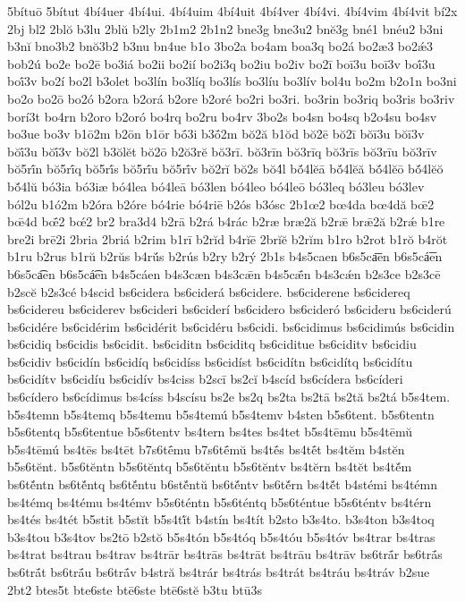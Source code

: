 {5bítuō
5bítut
4bí4uer
4bí4ui.
4bí4uim
4bí4uit
4bí4ver
4bí4vi.
4bí4vim
4bí4vit
bí2x
2bj
bl2
2blŏ
b3lu
2blŭ
b2ly
2b1m2
2b1n2
bne3g
bne3u2
bnĕ3g
bné1
bnéu2
b3ni
b3nĭ
bno3b2
bnŏ3b2
b3nu
bn4ue
b1o
3bo2a
bo4am
boa3q
bo2á
bo2æ3
bo2ǽ3
bob2ú
bo2e
bo2ē
bo3iá
bo2ii
bo2ií
bo2i3q
bo2iu
bo2iv
bo2ī
boī3u
boī3v
boī́3u
boī́3v
bo2í
bo2l
b3olet
bo3lín
bo3líq
bo3lís
bo3líu
bo3lív
bol4u
bo2m
b2o1n
bo3ni
bo2o
bo2ō
bo2ó
b2ora
b2orá
b2ore
b2oré
bo2ri
bo3ri.
bo3rin
bo3riq
bo3ris
bo3riv
borí3t
bo4rn
b2oro
b2oró
bo4rq
bo2ru
bo4rv
3bo2s
bo4sn
bo4sq
b2o4su
bo4sv
bo3ue
bo3v
b1ō2m
b2ōn
b1ōr
bṓ3i
b3ṓ2m
bŏ2ă
b1ŏd
bŏ2ē
bŏ2ī
bŏī3u
bŏī3v
bŏī́3u
bŏī́3v
bŏ2l
b3ŏlĕt
bŏ2ō
b2ŏ3rĕ
bŏ3rī.
bŏ3rīn
bŏ3rīq
bŏ3rīs
bŏ3rīu
bŏ3rīv
bŏ5rī́n
bŏ5rī́q
bŏ5rī́s
bŏ5rī́u
bŏ5rī́v
bŏ2rĭ
bŏ2s
bŏ4́l
bŏ́4lĕā
bŏ́4lĕă
bŏ́4lĕō
bŏ́4lĕŏ
bŏ́4lŭ
bó3ia
bó3iæ
bó4lea
bó4leā
bó3len
bó4leo
bó4leō
bó3leq
bó3leu
bó3lev
ból2u
b1ó2m
b2óra
b2óre
bó4rie
bó4riē
b2ós
b3ósc
2b1œ2
bœ4da
bœ4dă
bœ̄2
bœ̄4d
bœ̄́2
bœ́2
br2
bra3d4
b2rā
b2rá
b4rác
b2ræ
bræ2ă
b2rǣ
brǣ2ă
b2rǽ
b1re
bre2i
brē2i
2bria
2briá
b2rim
b1rī
b2rĭd
b4rĭē
2brĭĕ
b2rĭm
b1ro
b2rot
b1rŏ
b4rŏt
b1ru
b2rus
b1rŭ
b2rŭs
b4rŭ́s
b2rús
b2ry
b2rý
2b1s
b4s5caen
b6s5ca͞en
b6s5cá͞en
b6s5ca͡en
b6s5cá͡en
b4s5cáen
b4s3cæn
b4s3cǣn
b4s5cǣ́n
b4s3cǽn
b2s3ce
b2s3cē
b2scĕ
b2s3cé
b4scid
bs6cidera
bs6ciderá
bs6cidere.
bs6ciderene
bs6cidereq
bs6cidereu
bs6ciderev
bs6cideri
bs6ciderí
bs6cidero
bs6cideró
bs6cideru
bs6ciderú
bs6cidére
bs6cidérim
bs6cidérit
bs6cidéru
bs6cidi.
bs6cidimus
bs6cidimús
bs6cidin
bs6cidiq
bs6cidis
bs6cidit.
bs6ciditn
bs6ciditq
bs6ciditue
bs6ciditv
bs6cidiu
bs6cidiv
bs6cidín
bs6cidíq
bs6cidíss
bs6cidíst
bs6cidítn
bs6cidítq
bs6cidítu
bs6cidítv
bs6cidíu
bs6cidív
bs4ciss
b2scī
bs2cĭ
b4scíd
bs6cídera
bs6cíderi
bs6cídero
bs6cídimus
bs4císs
b4scísu
bs2e
bs2q
bs2ta
bs2tā
bs2tă
bs2tá
b5s4tem.
b5s4temn
b5s4temq
b5s4temu
b5s4temú
b5s4temv
b4sten
b5s6tent.
b5s6tentn
b5s6tentq
b5s6tentue
b5s6tentv
bs4tern
bs4tes
bs4tet
b5s4tēmu
b5s4tēmŭ
b5s4tēmú
bs4tēs
bs4tēt
b7s6tḗmu
b7s6tḗmŭ
bs4tḗs
bs4tḗt
bs4tĕm
b4stĕn
b5s6tĕnt.
b5s6tĕntn
b5s6tĕntq
b5s6tĕntu
b5s6tĕntv
bs4tĕrn
bs4tĕt
bs4tĕ́m
bs6tĕ́ntn
bs6tĕ́ntq
bs6tĕ́ntu
b6stĕ́ntŭ
bs6tĕ́ntv
bs6tĕ́rn
bs4tĕ́t
b4stémi
bs4témn
bs4témq
bs4tému
bs4témv
b5s6téntn
b5s6téntq
b5s6téntue
b5s6téntv
bs4térn
bs4tés
bs4tét
b5stit
b5stĭt
b5s4tĭ́t
b4stín
bs4tít
b2sto
b3s4to.
b3s4ton
b3s4toq
b3s4tou
b3s4tov
bs2tō
b2stŏ
b5s4tón
b5s4tóq
b5s4tóu
b5s4tóv
bs4trar
bs4tras
bs4trat
bs4trau
bs4trav
bs4trār
bs4trās
bs4trāt
bs4trāu
bs4trāv
bs6trā́r
bs6trā́s
bs6trā́t
bs6trā́u
bs6trā́v
b4stră
bs4trár
bs4trás
bs4trát
bs4tráu
bs4tráv
b2sue
2bt2
btes5t
bte6ste
btē6ste
btē6stĕ
b3tu
btū3s
}
